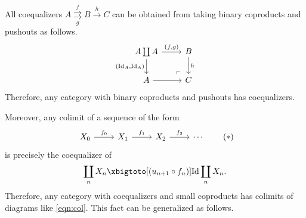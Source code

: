 \documentclass[10pt,letterpaper,cm]{nupset}
\theoremstyle{definition}
\theoremstyle{theorem}
\theoremstyle{remark}
\newcommand{\1}{\mathbf{1}}
\newcommand{\0}{\vec 0}
\DeclareMathOperator{\id}{Id}
\begin{document}
\smallskip

All coequalizers $A \overset{f}{\underset{g}{\rightrightarrows}} B \overset{h}{\longrightarrow} C$ can be obtained from taking binary coproducts and pushouts as follows.
\[
\begin{tikzcd}
A\coprod A \arrow[d, "{\left(\id_A, \id_A\right)}"']
 \arrow[dr, phantom, "\ulcorner", very near end]
 \arrow[r, "{\left(f,g\right)}"] & B \arrow[d, "h"] \\
A \arrow[r]                                                                      & C               
\end{tikzcd}
\] Therefore, any category with binary coproducts and pushouts has coequalizers.

   {\bigRelbar\bigRelbar{\bigtwoarrowsleft\rightarrow\rightarrow}}

Moreover, any colimit of a sequence of the form
\[ \label{eqn:col}
\begin{tikzcd}
X_0 \arrow[r, "f_0"] & X_1 \arrow[r, "f_1"] & X_2 \arrow[r, "f_2"] & \cdots
\end{tikzcd} \tag{$\ast$}
\] is precisely the coequalizer of
\[
\coprod_nX_n \xbigtoto[\left(u_{n+1}\circ f_n\right)]{\id} \coprod_nX_n.
\] Therefore, any category with coequalizers and small coproducts has colimits of diagrams like \eqref{eqn:col}. This fact can be generalized as follows.

\smallskip
\end{document}
